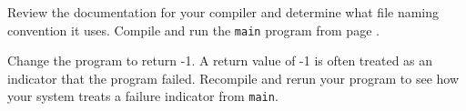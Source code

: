 %
%
\begin{question}
Review the documentation for your compiler and determine
what file naming convention it uses. Compile and run the \verb|main| program from
page \pageref{lst:simple main}.
\end{question}

\begin{question}
Change the program to return -1. A return value of -1 is
often treated as an indicator that the program failed. Recompile and rerun
your program to see how your system treats a failure indicator from \verb|main|.
\end{question}
